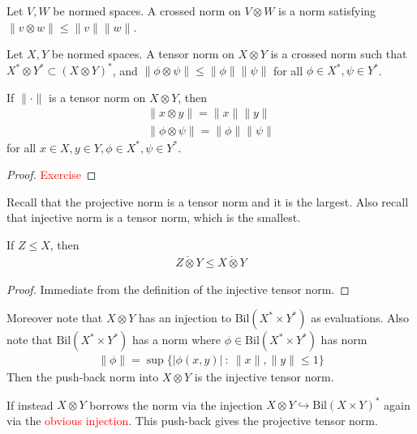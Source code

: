 

\begin{definition}
  Let $V, W$ be normed spaces. A crossed norm on $V \otimes W$ is a
  norm satisfying $ \|v \otimes w\| \le \|v\| \|w\|$.
\end{definition}
\begin{definition}
  Let $X, Y$ be normed spaces. A tensor norm on $X \otimes Y$ is a
  crossed norm such that $ X^* \otimes Y^* \subset (X \otimes Y)^*$,
  and $ \|\phi \otimes \psi\| \le \|\phi\| \|\psi\|$ for all $ \phi
  \in X^*, \psi \in Y^*$.
\end{definition}

\begin{lemma}
  If $\|\cdot\|$ is a tensor norm on $X \otimes Y$, then
  \begin{align*}
    \|x \otimes y \| = \|x\| \|y\| \\
    \|\phi \otimes \psi \| = \|\phi\| \|\psi\|
  \end{align*}
  for all $x \in X, y \in Y, \phi \in X^*, \psi \in Y^*$.
\end{lemma}
\begin{proof}
  \textcolor{red}{Exercise}
\end{proof}

Recall that the projective norm is a tensor norm and it is the
largest. Also recall that injective norm is a tensor norm, which is
the smallest.

\begin{theorem}
  If $Z \leqslant X$, then
  \begin{align*}
    Z \check{\otimes} Y \leqslant X \check{\otimes} Y
  \end{align*}
\end{theorem}
\begin{proof}
  Immediate from the definition of the injective tensor norm.
\end{proof}

Moreover note that $X \otimes Y$ has an injection to
$\textrm{Bil}(X^* \times Y^*)$ as evaluations. Also note that
$\textrm{Bil}(X^* \times Y^*)$ has a norm where $\phi \in
\textrm{Bil}(X^* \times Y^*)$ has norm
\begin{align*}
  \|\phi\| = \sup\{|\phi(x, y)| \ : \ \|x\|, \|y\| \le 1\}
\end{align*}
Then the push-back norm into $X \otimes Y$ is the injective tensor norm.

If instead $X \otimes Y$ borrows the norm via the injection $X
\otimes Y \hookrightarrow \textrm{Bil}(X \times Y)^*$ again via the
\textcolor{red}{obvious injection}. This push-back gives the
projective tensor norm.

